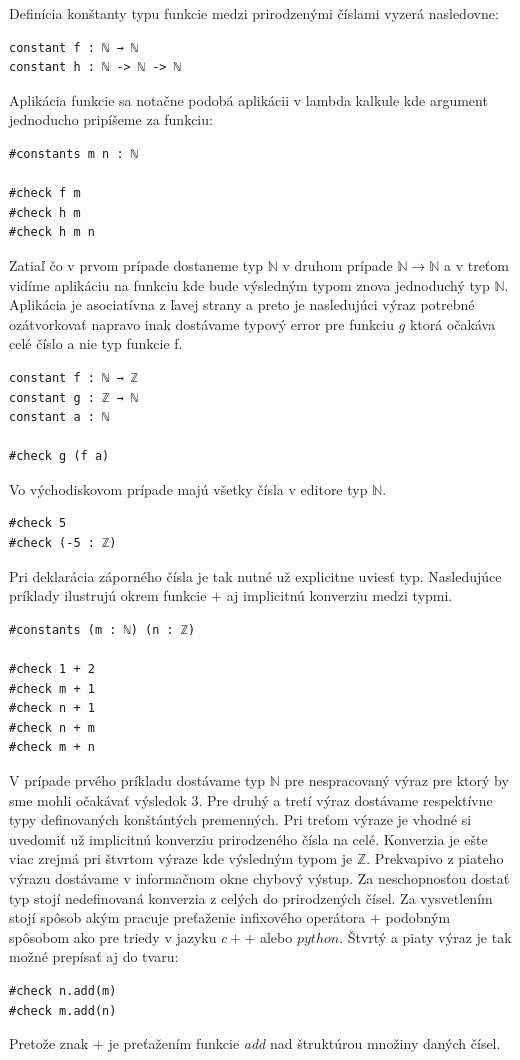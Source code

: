 \documentclass[a4paper,10pt,oneside]{report}%
\begin{document}
    Definícia konštanty typu funkcie medzi prirodzenými číslami vyzerá nasledovne:
\begin{lstlisting}
constant f : ℕ → ℕ
constant h : ℕ -> ℕ -> ℕ
\end{lstlisting}
    Aplikácia funkcie sa notačne podobá aplikácii v lambda kalkule kde argument
jednoducho pripíšeme za funkciu:
\begin{lstlisting}
#constants m n : ℕ

#check f m
#check h m
#check h m n
\end{lstlisting}
    Zatiaľ čo v prvom prípade dostaneme typ $\mathbb{N}$ v druhom prípade
$\mathbb{N} \to \mathbb{N}$ a v treťom vidíme aplikáciu na funkciu kde bude výsledným
typom znova jednoduchý typ $\mathbb{N}$.
    Aplikácia je asociatívna z ľavej strany a  preto je nasledujúci výraz potrebné 
ozátvorkovať napravo inak dostávame typový error pre funkciu $g$ ktorá očakáva 
celé číslo a nie typ funkcie f.
\begin{lstlisting}
constant f : ℕ → ℤ
constant g : ℤ → ℕ
constant a : ℕ

#check g (f a)
\end{lstlisting}
    Vo východiskovom prípade majú všetky čísla v editore typ $\mathbb{N}$.
\begin{lstlisting}
#check 5
#check (-5 : ℤ)
\end{lstlisting}
    Pri deklarácia záporného čísla je tak nutné už explicitne uviesť typ.
Nasledujúce príklady ilustrujú okrem funkcie $+$ aj implicitnú konverziu medzi typmi.
\begin{lstlisting}
#constants (m : ℕ) (n : ℤ)

#check 1 + 2
#check m + 1
#check n + 1
#check n + m
#check m + n
\end{lstlisting}
    V prípade prvého príkladu dostávame typ $\mathbb{N}$ pre nespracovaný výraz pre
ktorý by sme mohli očakávať výsledok $3$.
    Pre druhý a tretí výraz dostávame respektívne typy definovaných konštántých
premenných.
    Pri treťom výraze je vhodné si uvedomiť už implicitnú konverziu prirodzeného
čísla na celé.
    Konverzia je ešte viac zrejmá pri štvrtom výraze kde výsledným typom je
$\mathbb{Z}$.
    Prekvapivo z piateho výrazu dostávame v informačnom okne chybový výstup.
    Za neschopnosťou dostať typ stojí nedefinovaná konverzia z celých do prirodzených
čísel.
    Za vysvetlením stojí spôsob akým pracuje preťaženie infixového operátora $+$
podobným spôsobom ako pre triedy v jazyku $c++$ alebo $python$. Štvrtý a piaty
výraz je tak možné prepísať aj do tvaru:
\begin{lstlisting}
#check n.add(m)
#check m.add(n)
\end{lstlisting}
    Pretože znak $+$ je preťažením funkcie \emph{add} nad štruktúrou množiny daných
čísel.
\end{document}
